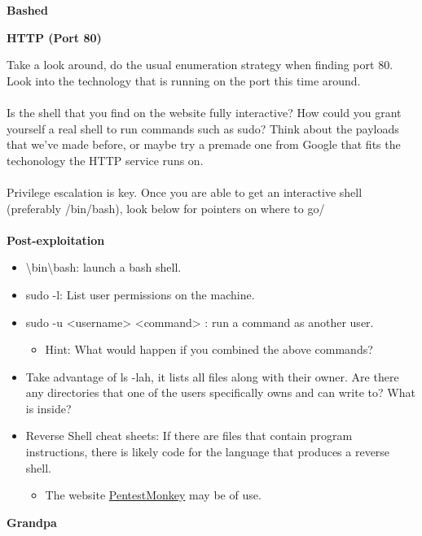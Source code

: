 \documentclass[a4paper,11pt]{article}
\renewcommand{\tt}[2][tt]{\textcolor{#1}{\ttfamily #2}}%
\begin{document}
\begin{center}
{\bfseries Bashed}
\end{center}

{\bfseries HTTP (Port 80)}

Take a look around, do the usual enumeration strategy when finding port 80. Look into the technology that is running on the port this time around.
\\
\\
Is the shell that you find on the website fully interactive? How could you grant yourself a real shell to run commands such as \tt{sudo}? Think about the payloads that we've made before, or maybe try a premade one from Google that fits the techonology the HTTP service runs on.
\\
\\
Privilege escalation is key. Once you are able to get an interactive shell (preferably /bin/bash), look below for pointers on where to go/
\\
\\
{\bfseries Post-exploitation}
\begin{itemize}
    \item \tt {\textbackslash bin\textbackslash bash}: launch a \tt{bash} shell.
    \item \tt{sudo -l}: List user permissions on the machine.
    \item \tt{sudo -u <username> <command> }: run a command as another user.
    \begin{itemize}
        \item Hint: What would happen if you combined the above commands?
    \end{itemize}
    \item Take advantage of \tt{ls -lah}, it lists all files along with their owner. Are there any directories that one of the users specifically owns and can write to? What is inside?
    \item Reverse Shell cheat sheets: If there are files that contain program instructions, there is likely code for the language that produces a reverse shell.
    \begin{itemize}
        \item The website \href{http://pentestmonkey.net/}{PentestMonkey} may be of use.
    \end{itemize}
\end{itemize}
\pagebreak

\begin{center}
    {\bfseries Grandpa}
\end{center}
\end{document}
